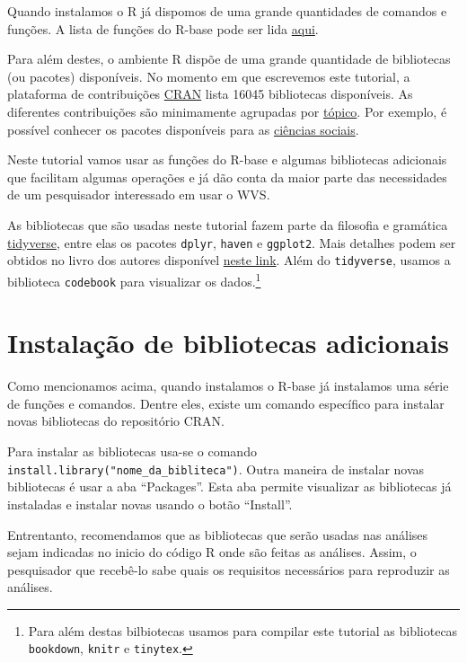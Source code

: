 \documentclass[
  brazil,
]{book}
\begin{document}
Quando instalamos o R já dispomos de uma grande quantidades de comandos e funções. A lista de funções do R-base pode ser lida \href{https://stat.ethz.ch/R-manual/R-devel/library/base/html/00Index.html}{aqui}.

Para além destes, o ambiente R dispõe de uma grande quantidade de bibliotecas (ou pacotes) disponíveis. No momento em que escrevemos este tutorial, a plataforma de contribuições \href{https://cran.r-project.org/web/packages/}{CRAN} lista 16045 bibliotecas disponíveis. As diferentes contribuições são minimamente agrupadas por \href{https://cran.r-project.org/web/views/}{tópico}. Por exemplo, é possível conhecer os pacotes disponíveis para as \href{https://cran.r-project.org/web/views/SocialSciences.html}{ciências sociais}.

Neste tutorial vamos usar as funções do R-base e algumas bibliotecas adicionais que facilitam algumas operações e já dão conta da maior parte das necessidades de um pesquisador interessado em usar o WVS.

As bibliotecas que são usadas neste tutorial fazem parte da filosofia e gramática \href{https://www.tidyverse.org/}{tidyverse}, entre elas os pacotes \texttt{dplyr}, \texttt{haven} e \texttt{ggplot2}. Mais detalhes podem ser obtidos no livro dos autores disponível \href{https://r4ds.had.co.nz/}{neste link}. Além do \texttt{tidyverse}, usamos a biblioteca \texttt{codebook} para visualizar os dados.\footnote{Para além destas bilbiotecas usamos para compilar este tutorial as bibliotecas \texttt{bookdown}, \texttt{knitr} e \texttt{tinytex}.}

\hypertarget{instalauxe7uxe3o-de-bibliotecas-adicionais}{%
\section{Instalação de bibliotecas adicionais}\label{instalauxe7uxe3o-de-bibliotecas-adicionais}}

Como mencionamos acima, quando instalamos o R-base já instalamos uma série de funções e comandos. Dentre eles, existe um comando específico para instalar novas bibliotecas do repositório CRAN.

Para instalar as bibliotecas usa-se o comando \texttt{install.library("nome\_da\_bibliteca")}. Outra maneira de instalar novas bibliotecas é usar a aba ``Packages''. Esta aba permite visualizar as bibliotecas já instaladas e instalar novas usando o botão ``Install''.

Entrentanto, recomendamos que as bibliotecas que serão usadas nas análises sejam indicadas no inicio do código R onde são feitas as análises. Assim, o pesquisador que recebê-lo sabe quais os requisitos necessários para reproduzir as análises.
\end{document}

